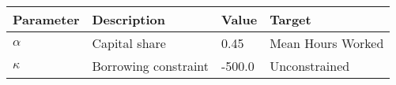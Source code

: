 \begin{tabular}{l l l l} 
\hline 
Parameter & Description & Value & Target \\ 
\hline 
$\alpha$ & Capital share & 0.45 & Mean Hours Worked \\ 
$\kappa$ & Borrowing constraint & -500.0 & Unconstrained \\ 
\hline 
\end{tabular}